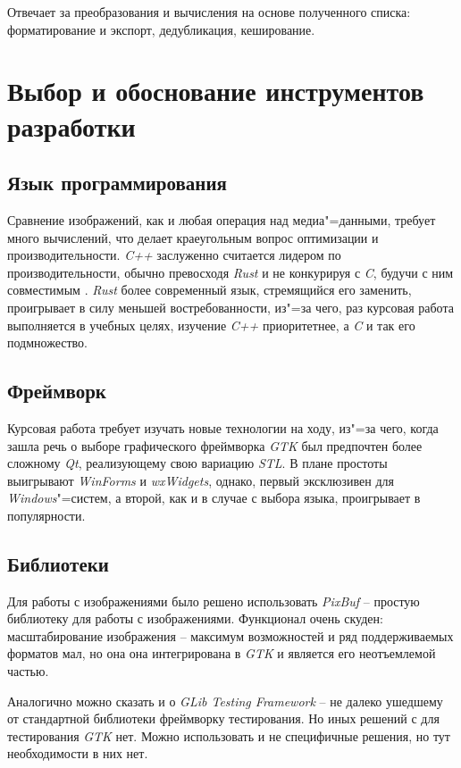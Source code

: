 Отвечает за преобразования и вычисления на основе полученного списка:
форматирование и экспорт, дедубликация, кеширование.

\section{Выбор и обоснование инструментов разработки}

\subsection{Язык программирования}

Сравнение изображений, как и любая операция над медиа"=данными, требует много
вычислений, что делает краеугольным вопрос оптимизации и производительности.
\textit{C++} заслуженно считается лидером по производительности, обычно
превосходя \textit{Rust} и не конкурируя с \textit{C}, будучи с ним совместимым
\cite{benchmarksgame}. \textit{Rust} более современный язык, стремящийся его
заменить, проигрывает в силу меньшей востребованности, из"=за чего, раз курсовая
работа выполняется в учебных целях, изучение \textit{C++} приоритетнее, а
\textit{C} и так его подмножество.

\subsection{Фреймворк}

Курсовая работа требует изучать новые технологии на ходу, из"=за чего, когда
зашла речь о выборе графического фреймворка \textit{GTK} был предпочтен более
сложному \textit{Qt}, реализующему свою вариацию \textit{STL}. В плане простоты
выигрывают \textit{WinForms} и \textit{wxWidgets}, однако, первый эксклюзивен
для \textit{Windows}"=систем, а второй, как и в случае с выбора языка,
проигрывает в популярности.

\subsection{Библиотеки}

Для работы с изображениями было решено использовать \textit{PixBuf} --
простую библиотеку для работы с изображениями. Функционал очень скуден:
масштабирование изображения -- максимум возможностей и ряд поддерживаемых
форматов мал, но она она интегрирована в \textit{GTK} и является его
неотъемлемой частью.

Аналогично можно сказать и о \textit{GLib Testing Framework} -- не далеко
ушедшему от стандартной библиотеки фреймворку тестирования. Но иных решений с
для тестирования \textit{GTK} нет. Можно использовать и не специфичные решения,
но тут необходимости в них нет.

